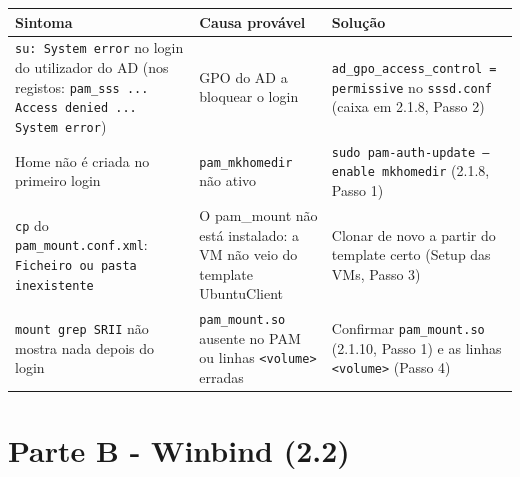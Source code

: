 \begin{center}\small
\begin{tabularx}{\linewidth}{|>{\raggedright\arraybackslash}X|>{\raggedright\arraybackslash}X|>{\raggedright\arraybackslash}X|}
\hline
\rowcolor{azul!10}\textbf{Sintoma} & \textbf{Causa provável} & \textbf{Solução} \\
\hline
\texttt{su: System error} no login do utilizador do AD (nos registos: \texttt{pam\_sss ... Access denied ... System error}) & GPO do AD a bloquear o login & \texttt{ad\_gpo\_access\_control = permissive} no \texttt{sssd.conf} (caixa em 2.1.8, Passo 2) \\
\hline
Home não é criada no primeiro login & \texttt{pam\_mkhomedir} não ativo & \texttt{sudo pam-auth-update --enable mkhomedir} (2.1.8, Passo 1) \\
\hline
\texttt{cp} do \texttt{pam\_mount.conf.xml}: \texttt{Ficheiro ou pasta inexistente} & O pam\_mount não está instalado: a VM não veio do template UbuntuClient & Clonar de novo a partir do template certo (Setup das VMs, Passo 3) \\
\hline
\texttt{mount \textbar{} grep SRII} não mostra nada depois do login & \texttt{pam\_mount.so} ausente no PAM ou linhas \texttt{\textless{}volume\textgreater{}} erradas & Confirmar \texttt{pam\_mount.so} (2.1.10, Passo 1) e as linhas \texttt{\textless{}volume\textgreater{}} (Passo 4) \\
\hline
\end{tabularx}
\end{center}

\label{ec-b2}

\section*{Parte B - Winbind (2.2)}

